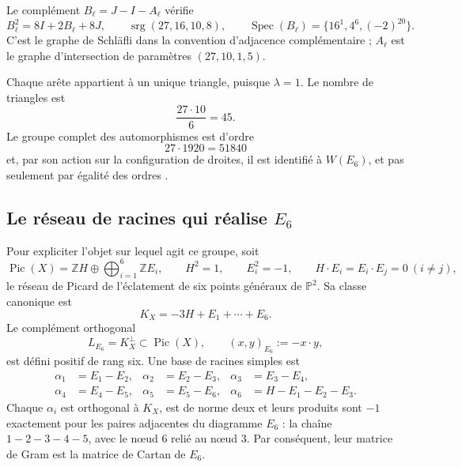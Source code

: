 Le complément \(B_\ell=J-I-A_\ell\) vérifie
\begin{equation}
 B_\ell^2=8I+2B_\ell+8J,
 \qquad
 \operatorname{srg}(27,16,10,8),
 \qquad
 \operatorname{Spec}(B_\ell)=\{16^1,4^6,(-2)^{20}\}.
 \label{p12-83-c20-s6:eq:complemento-schlafli}
\end{equation}
C'est le graphe de Schläfli dans la convention d'adjacence complémentaire ; \(A_\ell\) est le graphe d'intersection de paramètres \((27,10,1,5)\).

Chaque arête appartient à un unique triangle, puisque \(\lambda=1\). Le nombre
de triangles est
\[
 \frac{27\cdot10}{6}=45.
\]
Le groupe complet des automorphismes est d’ordre
\[
 27\cdot1920=51840
\]
et, par son action sur la configuration de droites, il est identifié à \(W(E_6)\), et pas seulement par égalité des ordres \cite{Manivel2005}.

\subsection{Le réseau de racines qui réalise \texorpdfstring{\(E_6\)}{E6}}

Pour expliciter l’objet sur lequel agit ce groupe, soit
\begin{equation}
 \operatorname{Pic}(X)
 =\mathbb ZH\oplus\bigoplus_{i=1}^6\mathbb ZE_i,
 \qquad
 H^2=1,\qquad E_i^2=-1,\qquad H\cdot E_i=E_i\cdot E_j=0\ (i\ne j),
 \label{p12-83-c20-s6:eq:picard-cubica-e6}
\end{equation}
le réseau de Picard de l’éclatement de six points généraux de
\(\mathbb P^2\). Sa classe canonique est
\[
 K_X=-3H+E_1+\cdots+E_6.
\]
Le complément orthogonal
\begin{equation}
 L_{E_6}=K_X^\perp\subset\operatorname{Pic}(X),
 \qquad (x,y)_{E_6}:=-x\cdot y,
 \label{p12-83-c20-s6:eq:reticulo-raices-e6}
\end{equation}
est défini positif de rang six. Une base de racines simples est
\begin{equation}
 \begin{aligned}
 \alpha_1&=E_1-E_2,& \alpha_2&=E_2-E_3,&
 \alpha_3&=E_3-E_4,\\
 \alpha_4&=E_4-E_5,& \alpha_5&=E_5-E_6,&
 \alpha_6&=H-E_1-E_2-E_3.
 \end{aligned}
 \label{p12-83-c20-s6:eq:raices-simples-e6}
\end{equation}
Chaque \(\alpha_i\) est orthogonal à \(K_X\), est de norme deux et leurs produits
sont \(-1\) exactement pour les paires adjacentes du diagramme
\(E_6\) : la chaîne \(1-2-3-4-5\), avec le nœud \(6\) relié au nœud \(3\).
Par conséquent, leur matrice de Gram est la matrice de Cartan de \(E_6\).

